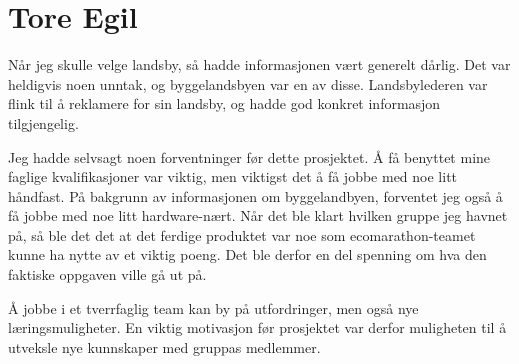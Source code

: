 \section{Tore Egil}
Når jeg skulle velge landsby, så hadde informasjonen vært generelt dårlig.
Det var heldigvis noen unntak, og byggelandsbyen var en av disse.
Landsbylederen var flink til å reklamere for sin landsby, og hadde god konkret informasjon tilgjengelig. 

Jeg hadde selvsagt noen forventninger før dette prosjektet. 
Å få benyttet mine faglige kvalifikasjoner var viktig, men viktigst det å få jobbe med noe litt håndfast.
På bakgrunn av informasjonen om byggelandbyen, forventet jeg også å få jobbe med noe litt hardware-nært.
Når det ble klart hvilken gruppe jeg havnet på, så ble det det at det ferdige produktet var noe som ecomarathon-teamet kunne ha nytte av et viktig poeng.
Det ble derfor en del spenning om hva den faktiske oppgaven ville gå ut på.

Å jobbe i et tverrfaglig team kan by på utfordringer, men også nye læringsmuligheter. 
En viktig motivasjon før prosjektet var derfor muligheten til å utveksle nye kunnskaper med gruppas medlemmer.


